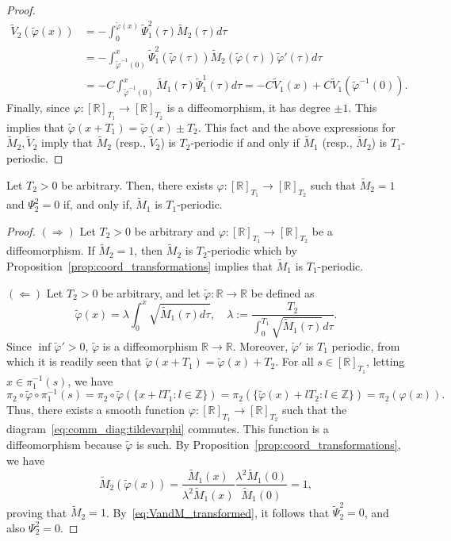\begin{proof}
\[\begin{aligned}
	\tilde V_2(\tilde \varphi(x)) &= - \int_0^{\tilde \varphi(x)} \tilde
	\Psi_1^2(\tau) \tilde M_2(\tau) d \tau \\
		&=-\int_{\tilde \varphi^{-1}(0)}^x \tilde \Psi_1^2( \tilde
	\varphi(\tau)) \tilde M_2( \tilde \varphi(\tau)) \tilde \varphi'(\tau)
	d \tau \\
		& = -C \int_{\tilde \varphi^{-1}(0)}^x \tilde M_1(\tau) \tilde
	\Psi_1^1(\tau) d \tau = -C \tilde V_1(x) + C\tilde V_1(\tilde
	\varphi^{-1}(0)).
	\end{aligned}
	\]
				Finally, since $\varphi: [\mathbb{R}]_{T_1} \to [\mathbb{R}]_{T_2}$ is a diffeomorphism, it
	has degree $\pm 1$. This implies that $\tilde \varphi(x+T_1) = \tilde
	\varphi(x) \pm T_2$.  This fact and the above expressions for
	$\tilde M_2,\tilde V_2$ imply that $\tilde M_2$ (resp., $\tilde V_2$)
	is $T_2$-periodic if and only if $\tilde M_1$ (resp., $\tilde M_2$) is
	$T_1$-periodic.
				\qquad\end{proof}
\begin{proposition}
	\label{prop:conservative}
	Let $T_2>0$ be arbitrary. Then, there exists $\varphi:[\mathbb{R}]_{T_1} \to [\mathbb{R}]_{T_2}$
	such that $\tilde M_2=1$ and $\Psi_2^2=0$ if, and only if, $\tilde
	M_1$ is $T_1$-periodic.
\end{proposition}
\begin{proof}
	$(\Rightarrow)$ Let $T_2>0$ be arbitrary and $\varphi: [\mathbb{R}]_{T_1} \to [\mathbb{R}]_{T_2}$
	be a diffeomorphism. If $\tilde M_2=1$, then $\tilde M_2$ is
	$T_2$-periodic which by Proposition~\ref{prop:coord_transformations}
	implies that $\tilde M_1$ is $T_1$-periodic.
	
	$(\Leftarrow)$ Let $T_2>0$ be arbitrary, and let $\tilde \varphi: \mathbb{R}
	\to \mathbb{R}$ be defined as
				\[
	\tilde \varphi(x) = \lambda \int_0^x \sqrt{\tilde M_1(\tau) d \tau}, \quad
	\lambda:=\frac{T_2}{\int_0^{T_1} \sqrt{\tilde M_1(\tau)} d \tau}.
	\]
				Since $\inf \tilde \varphi'>0$, $\tilde \varphi$ is a diffeomorphism
	$\mathbb{R} \to \mathbb{R}$. Moreover, $\tilde \varphi'$ is $T_1$ periodic, from
	which it is readily seen that $\tilde \varphi(x+T_1) = \tilde
	\varphi(x) + T_2$. For all $ s \in [\mathbb{R}]_{T_1}$, letting $x \in
	\pi_1^{-1}(s)$, we have
					\[ 
	\pi_2 \circ
	\tilde \varphi \circ \pi_1^{-1}(s)=\pi_2 \circ \tilde \varphi(\{x+l
	T_1: l \in \mathbb{Z}\}) = \pi_2 (\{ \tilde \varphi(x)+lT_2: l \in \mathbb{Z}\}) =
	\pi_2(\varphi(x)).
	\]
				Thus, there exists a smooth function $\varphi: [\mathbb{R}]_{T_1} \to [\mathbb{R}]_{T_2}$ such
	that the diagram~\eqref{eq:comm_diag:tildevarphi} commutes. This
	function is a diffeomorphism because $\tilde \varphi$ is such. By
	Proposition~\ref{prop:coord_transformations}, we have
				\[
	\tilde M_2 (\tilde \varphi(x)) = \frac{\tilde M_1(x)}{\lambda^2 \tilde
		M_1(x)} \frac{\lambda^2 \tilde M_1(0)}{\tilde M_1(0)} =1,
	\]
				proving that $\tilde M_2=1$. By~\eqref{eq:VandM_transformed}, it
	follows that $\tilde \Psi_2^2=0$, and also $\Psi_2^2 =0$.
	\qquad\end{proof}

